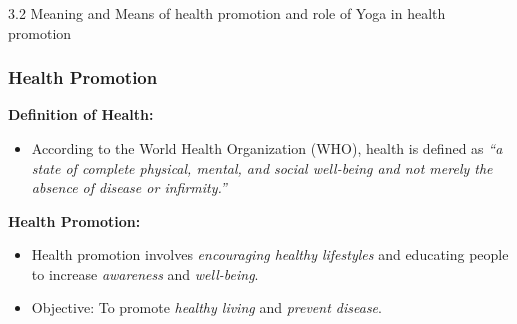 \begin{frame}[fragile]\frametitle{}
\begin{center}
{\Large 3.2  Meaning and Means of health promotion and role of Yoga  in health promotion}
\end{center}
\end{frame}

\begin{frame}[fragile]\frametitle{Health Promotion}
    \textbf{Definition of Health:}
    \begin{itemize}
        \item According to the World Health Organization (WHO), health is defined as \textit{“a state of complete physical, mental, and social well-being and not merely the absence of disease or infirmity.”}
    \end{itemize}

    \textbf{Health Promotion:}
    \begin{itemize}
        \item Health promotion involves \textit{encouraging healthy lifestyles} and educating people to increase \textit{awareness} and \textit{well-being}.
        \item Objective: To promote \textit{healthy living} and \textit{prevent disease}.
    \end{itemize}
\end{frame}


